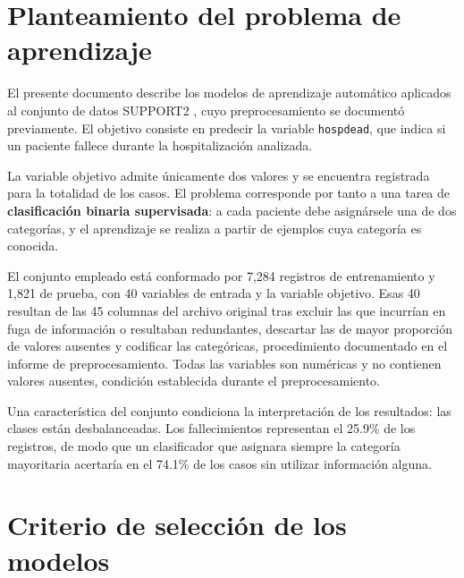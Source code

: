 \documentclass[11pt]{article}
\begin{document}

\tableofcontents
\newpage

\section{Planteamiento del problema de aprendizaje}

El presente documento describe los modelos de aprendizaje automático aplicados al conjunto de
datos SUPPORT2 \parencite{support2}, cuyo preprocesamiento se documentó previamente. El objetivo
consiste en predecir la variable \texttt{hospdead}, que indica si un paciente fallece durante la
hospitalización analizada.

La variable objetivo admite únicamente dos valores y se encuentra registrada para la totalidad de
los casos. El problema corresponde por tanto a una tarea de \textbf{clasificación binaria
supervisada}: a cada paciente debe asignársele una de dos categorías, y el aprendizaje se realiza
a partir de ejemplos cuya categoría es conocida.

El conjunto empleado está conformado por 7{,}284 registros de entrenamiento y 1{,}821 de prueba,
con 40 variables de entrada y la variable objetivo. Esas 40 resultan de las 45 columnas del
archivo original tras excluir las que incurrían en fuga de información o resultaban redundantes,
descartar las de mayor proporción de valores ausentes y codificar las categóricas, procedimiento
documentado en el informe de preprocesamiento. Todas las variables son numéricas y no
contienen valores ausentes, condición establecida durante el preprocesamiento.

Una característica del conjunto condiciona la interpretación de los resultados: las clases están
desbalanceadas. Los fallecimientos representan el 25.9\% de los registros, de modo que un
clasificador que asignara siempre la categoría mayoritaria acertaría en el 74.1\% de los casos sin
utilizar información alguna.

\section{Criterio de selección de los modelos}
\end{document}
